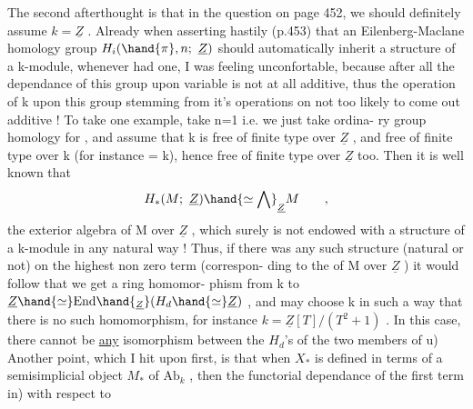 The second afterthought is  that in the question on page 452,  we
should definitely assume $k=\underline{Z}$ .  Already when asserting hastily (p.453)
that an Eilenberg-Maclane homology group $H_i(\hand{\pi},n;\ \underline{Z})$  should automatically
inherit a structure of a k-module,  whenever \hand{$\pi$} had one,  I was feeling
unconfortable,  because after all the dependance of this group upon
variable \hand{$\pi$} is not at all additive,  thus the operation of k upon this
group stemming from it's operations on \hand{$\pi$}   not too likely to come
out additive !  To take one example,  take n=1 i.e. we just take ordina-%
ry group homology for \hand{$\pi$} ,  and assume that k is free of finite type over
$\underline{Z}$ ,  and \hand{$\pi$} free of finite type over k (for instance = k),  hence free
of finite type over $\underline{Z}$ too.  Then it is well known that
\[ H_*(M;\ \underline{Z})\hand{\simeq \bigwedge}_{\underline{Z}}M \qquad , \]
the exterior algebra of M  over $\underline{Z}$ ,  which surely is not endowed with a
structure of a k-module in any natural way !  Thus,  if there was any
such structure (natural or not) on the highest non zero term (correspon-%
ding to the  of M over $\underline{Z}$ )\hand{,} it would follow that we get a ring homomor-%
phism  from  k to  $\underline{Z}\hand{\simeq} \mathrm{End}\hand{_{\underline{Z}}}(H_d\hand{\simeq} \underline{Z})$ ,  and  may choose k in such a
way that there is no such homomorphism,  for instance  $k = \underline{Z}[T]/(T^2+1)$ .
In this case,  there cannot be \uline{any} isomorphism  between the $H_d$'s of the
two members of \hand{(}u)  Another point,  which I hit upon first,  is that
when  $X_*$  is defined in terms of a semisimplicial object $M_*$ of $\mathrm{Ab}_k$ ,
then the functorial dependance of the first term in) with respect to


